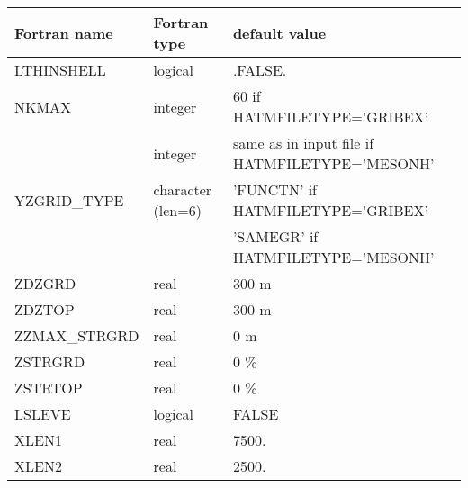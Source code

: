 \begin{center}
\begin{tabular} {|l|l|l|}
\hline
Fortran name & Fortran type & default value\\
\hline
\hline
LTHINSHELL     & logical    & .FALSE.    \\
NKMAX          & integer    & 60     if HATMFILETYPE='GRIBEX'  \\
               & integer    & same as in input file if HATMFILETYPE='MESONH'  \\
YZGRID\_TYPE   & character (len=6) & 'FUNCTN' if HATMFILETYPE='GRIBEX'  \\
               &                   & 'SAMEGR' if HATMFILETYPE='MESONH'  \\
ZDZGRD         & real & 300 m  \\
ZDZTOP         & real & 300 m     \\
ZZMAX\_STRGRD  & real & 0 m     \\
ZSTRGRD        & real & 0  \%        \\
ZSTRTOP        & real & 0 \% \\
LSLEVE         & logical & FALSE   \\
XLEN1          & real & 7500.   \\
XLEN2          & real & 2500.   \\
\hline
\end{tabular}
\end{center}

